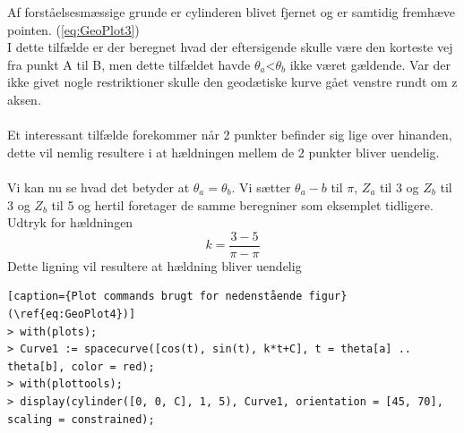 Af forståelsesmæssige grunde er cylinderen blivet fjernet og er samtidig fremhæve pointen. (\ref{eq:GeoPlot3})
\\
I dette tilfælde er der beregnet hvad der eftersigende skulle være den korteste vej fra punkt A til B, men dette tilfældet havde $\theta_a$<$\theta_b$ ikke været gældende. Var der ikke givet nogle restriktioner skulle den geodætiske kurve gået venstre rundt om z aksen.
\\
\\
Et interessant tilfælde forekommer når 2 punkter befinder sig lige over hinanden, dette vil nemlig resultere i at hældningen mellem de 2 punkter bliver uendelig.
\\
\\
Vi kan nu se hvad det betyder at $\theta_a=\theta_b$. Vi sætter $\theta_a-b$ til $\pi$, $Z_a$ til 3 og $Z_b$ til 3 og $Z_b$ til 5 og hertil foretager de samme beregniner som eksemplet tidligere.
\\
Udtryk for hældningen
\begin{equation}
k=\frac{3-5}{\pi-\pi}
\end{equation}
Dette ligning vil resultere at hældning bliver uendelig
\begin{lstlisting}[caption={Plot commands brugt for nedenstående figur}(\ref{eq:GeoPlot4})] 
> with(plots);
> Curve1 := spacecurve([cos(t), sin(t), k*t+C], t = theta[a] .. theta[b], color = red);
> with(plottools);
> display(cylinder([0, 0, C], 1, 5), Curve1, orientation = [45, 70], scaling = constrained);
\end{lstlisting}
